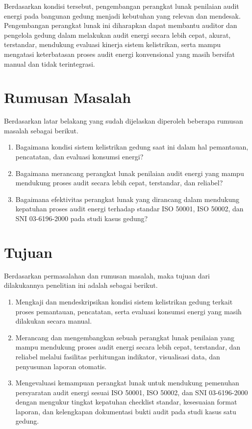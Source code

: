 Berdasarkan kondisi tersebut, pengembangan perangkat lunak penilaian audit energi pada bangunan gedung menjadi kebutuhan yang relevan dan mendesak. Pengembangan perangkat lunak ini diharapkan dapat membantu auditor dan pengelola gedung dalam melakukan audit energi secara lebih cepat, akurat, terstandar, mendukung evaluasi kinerja sistem kelistrikan, serta mampu mengatasi keterbatasan proses audit energi konvensional yang masih bersifat manual dan tidak terintegrasi.

\section{Rumusan Masalah}
Berdasarkan latar belakang yang sudah dijelaskan diperoleh beberapa rumusan masalah sebagai berikut.

\begin{enumerate}
    \item Bagaimana kondisi sistem kelistrikan gedung saat ini dalam hal pemantauan, pencatatan, dan evaluasi konsumsi energi?
    
    \item Bagaimana merancang perangkat lunak penilaian audit energi yang mampu mendukung proses audit secara lebih cepat, terstandar, dan reliabel?
    
    \item Bagaimana efektivitas perangkat lunak yang dirancang dalam mendukung kepatuhan proses audit energi terhadap standar ISO 50001, ISO 50002, dan SNI 03-6196-2000 pada studi kasus gedung?
\end{enumerate}

\section{Tujuan}
Berdasarkan permasalahan dan rumusan masalah, maka tujuan dari dilakukannya penelitian ini adalah sebagai berikut.

\begin{enumerate}
    \item Mengkaji dan mendeskripsikan kondisi sistem kelistrikan gedung terkait proses pemantauan, pencatatan, serta evaluasi konsumsi energi yang masih dilakukan secara manual.
    \item Merancang dan mengembangkan sebuah perangkat lunak penilaian yang mampu mendukung proses audit energi secara lebih cepat, terstandar, dan reliabel melalui fasilitas perhitungan indikator, visualisasi data, dan penyusunan laporan otomatis.
    \item Mengevaluasi kemampuan perangkat lunak untuk mendukung pemenuhan persyaratan audit energi sesuai ISO 50001, ISO 50002, dan SNI 03-6196-2000 dengan mengukur tingkat kepatuhan checklist standar, kesesuaian format laporan, dan kelengkapan dokumentasi bukti audit pada studi kasus satu gedung.
\end{enumerate}

